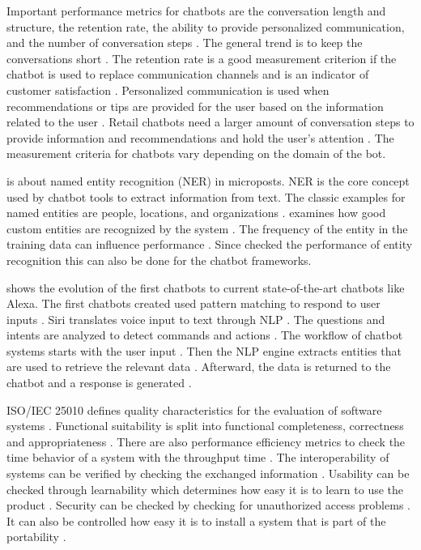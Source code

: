 Important performance metrics for chatbots are the conversation length and structure, the retention rate, the ability to provide personalized communication, and the number of conversation steps \cite{PRZEGALINSKA2019785}.
The general trend is to keep the conversations short \cite{PRZEGALINSKA2019785}.
The retention rate is a good measurement criterion if the chatbot is used to replace communication channels and is an indicator of customer satisfaction \cite{PRZEGALINSKA2019785}.
Personalized communication is used when recommendations or tips are provided for the user based on the information related to the user \cite{PRZEGALINSKA2019785}.
Retail chatbots need a larger amount of conversation steps to provide information and recommendations and hold the user's attention \cite{PRZEGALINSKA2019785}.
The measurement criteria for chatbots vary depending on the domain of the bot.

\citet{geyer2016named} is about named entity recognition (NER) in microposts.
NER is the core concept used by chatbot tools to extract information from text.
The classic examples for named entities are people, locations, and organizations \cite{geyer2016named}.
\citet{geyer2016named} examines how good custom entities are recognized by the system \citet{geyer2016named}.
The frequency of the entity in the training data can influence performance \cite{geyer2016named}. 
Since \citet{geyer2016named} checked the performance of entity recognition this can also be done for the chatbot frameworks.

\citet{deshpande2017survey} shows the evolution of the first chatbots to current state-of-the-art chatbots like Alexa.
The first chatbots created used pattern matching to respond to user inputs \cite{deshpande2017survey}.
Siri translates voice input to text through NLP \cite{deshpande2017survey}. 
The questions and intents are analyzed to detect commands and actions \cite{deshpande2017survey}.
The workflow of chatbot systems starts with the user input \cite{deshpande2017survey}. 
Then the NLP engine extracts entities that are used to retrieve the relevant data \cite{deshpande2017survey}.
Afterward, the data is returned to the chatbot and a response is generated \cite{deshpande2017survey}.



ISO/IEC 25010 defines quality characteristics for the evaluation of software systems \cite{iso25010}.
Functional suitability is split into functional completeness, correctness and appropriateness \cite{iso25010}.
There are also performance efficiency metrics to check the time behavior of a system with the throughput time \cite{iso25010}.
The interoperability of systems can be verified by checking the exchanged information \cite{iso25010}.
Usability can be checked through learnability which determines how easy it is to learn to use the product \cite{iso25010}.
Security can be checked by checking for unauthorized access problems \cite{iso25010}.
It can also be controlled how easy it is to install a system that is part of the portability \cite{iso25010}.


